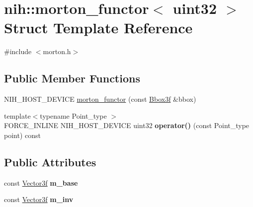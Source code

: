\hypertarget{structnih_1_1morton__functor_3_01uint32_01_4}{
\section{nih\-:\-:morton\-\_\-functor$<$ uint32 $>$ \-Struct \-Template \-Reference}
\label{structnih_1_1morton__functor_3_01uint32_01_4}
}


{\ttfamily \#include $<$morton.\-h$>$}

\subsection*{\-Public \-Member \-Functions}
\begin{DoxyCompactItemize}
\item 
\-N\-I\-H\-\_\-\-H\-O\-S\-T\-\_\-\-D\-E\-V\-I\-C\-E \hyperlink{structnih_1_1morton__functor_3_01uint32_01_4_a29085dec57c46e4a283003ab16d86d53}{morton\-\_\-functor} (const \hyperlink{structnih_1_1_bbox}{\-Bbox3f} \&bbox)
\item 
\hypertarget{structnih_1_1morton__functor_3_01uint32_01_4_aad247951319a598fd9a2916c784ede15}{
{\footnotesize template$<$typename Point\-\_\-type $>$ }\\\-F\-O\-R\-C\-E\-\_\-\-I\-N\-L\-I\-N\-E \-N\-I\-H\-\_\-\-H\-O\-S\-T\-\_\-\-D\-E\-V\-I\-C\-E uint32 {\bfseries operator()} (const \-Point\-\_\-type point) const }
\label{structnih_1_1morton__functor_3_01uint32_01_4_aad247951319a598fd9a2916c784ede15}

\end{DoxyCompactItemize}
\subsection*{\-Public \-Attributes}
\begin{DoxyCompactItemize}
\item 
\hypertarget{structnih_1_1morton__functor_3_01uint32_01_4_aadf0780e61b2cedd344e7a1367aecf6e}{
const \hyperlink{structnih_1_1_vector}{\-Vector3f} {\bfseries m\-\_\-base}}
\label{structnih_1_1morton__functor_3_01uint32_01_4_aadf0780e61b2cedd344e7a1367aecf6e}

\item 
\hypertarget{structnih_1_1morton__functor_3_01uint32_01_4_ac0996737b772c1a7f54513cfacec4146}{
const \hyperlink{structnih_1_1_vector}{\-Vector3f} {\bfseries m\-\_\-inv}}
\label{structnih_1_1morton__functor_3_01uint32_01_4_ac0996737b772c1a7f54513cfacec4146}

\end{DoxyCompactItemize}


